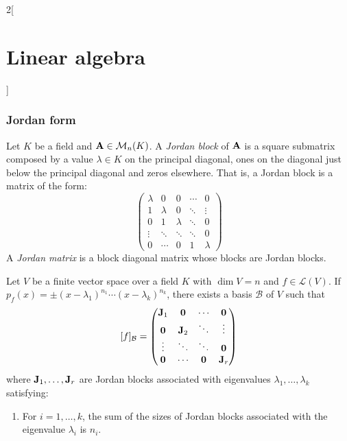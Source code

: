 \documentclass[../../../main.tex]{subfiles}
\begin{document}
\begin{multicols}{2}[\section{Linear algebra}]
  \subsubsection{Jordan form}
  \begin{definition}
    Let $K$ be a field and $\boldsymbol{\mathrm{A}}\in\mathcal{M}_n(K)$. A \emph{Jordan block} of $\boldsymbol{\mathrm{A}}$ is a square submatrix composed by a value $\lambda\in K$ on the principal diagonal, ones on the diagonal just below the principal diagonal and zeros elsewhere. That is, a Jordan block is a matrix of the form:
    $$
      \begin{pmatrix}
        \lambda & 0       & 0       & \cdots & 0       \\
        1       & \lambda & 0       & \ddots & \vdots  \\
        0       & 1       & \lambda & \ddots & 0       \\
        \vdots  & \ddots  & \ddots  & \ddots & 0       \\
        0       & \cdots  & 0       & 1      & \lambda
      \end{pmatrix}
    $$
    A \emph{Jordan matrix} is a block diagonal matrix whose blocks are Jordan blocks.
  \end{definition}
  \begin{prop}\label{LA_jordan}
    Let $V$ be a finite vector space over a field $K$ with $\dim V=n$ and $f\in\mathcal{L}(V)$. If $p_f(x)=\pm(x-\lambda_1)^{n_1}\cdots(x-\lambda_k)^{n_k}$, there exists a basis $\mathcal{B}$ of $V$ such that
    $$[f]_{\mathcal{B}}=
      \begin{pmatrix}
        \boldsymbol{\mathrm{J}}_1 & \boldsymbol{\mathrm{0}}   & \cdots             & \boldsymbol{\mathrm{0}}   \\
        \boldsymbol{\mathrm{0}}   & \boldsymbol{\mathrm{J}}_2 & \ddots             & \vdots               \\
        \vdots               & \ddots               & \ddots             & \boldsymbol{\mathrm{0}}   \\
        \boldsymbol{\mathrm{0}}   & \cdots               & \boldsymbol{\mathrm{0}} & \boldsymbol{\mathrm{J}}_r \\
      \end{pmatrix}
    $$
    where $\boldsymbol{\mathrm{J}}_1,\ldots,\boldsymbol{\mathrm{J}}_r$ are Jordan blocks associated with eigenvalues $\lambda_1,\ldots,\lambda_k$ satisfying:
    \begin{enumerate}
      \item\label{LA_diag1} For $i=1,\ldots,k$, the sum of the sizes of Jordan blocks associated with the eigenvalue $\lambda_i$ is $n_i$.

\end{enumerate}
\end{prop}
\end{multicols}
\end{document}
